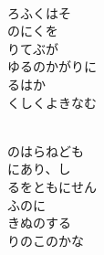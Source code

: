 \documentclass[10pt,b5j]{tarticle} %
\begin{document}
\begin{enumerate}
\begin{minipage}[c]{\blocksize}
        \vspace{\linespace}
        \item~\\
        ろふくはそ\\
        のにくを\\
        りてぶが\\
        ゆるのかがりに\\
        るはか\\
        くしくよきなむ
        
    \end{minipage}
    \begin{minipage}[c]{\blocksize}
        
        \vspace{\linespace}
        \item~\\
        のはらねども\\
        にあり、し\\
        るをともにせん\\
        ふのに\\
        きぬのする\\
        りのこのかな
    
    \end{minipage}
\end{enumerate} %
\end{document}
